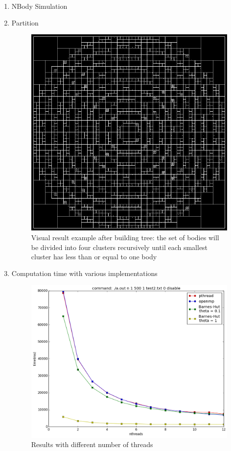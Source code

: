 \documentclass[12pt]{article}
\makeatletter
\renewenvironment{itemize}
{\list{$\bullet$}{\leftmargin\z@ \labelwidth\z@ \itemindent-\leftmargin
\let\makelabel\descriptionlabel}}
{\endlist}
\makeatother
\begin{document}
\begin{enumerate}
	\item NBody Simulation
	\begin{itemize}
		\item Partition
		\begin{figure}
			\vspace{-20pt}
			\includegraphics[scale=.45]{./partition.png}
			\caption{Visual result example after building tree: the set of bodies will be divided into four clusters recursively until each smallest cluster has less than or equal to one body}
		\end{figure}

		\newpage

		\item Computation time with various implementations
		\begin{center}
			\begin{figure}
				\includegraphics[scale=.5]{./nthreads.png}
				\caption{Results with different number of threads}
			\end{figure}


\end{center}
\end{itemize}
\end{enumerate}
\end{document}
